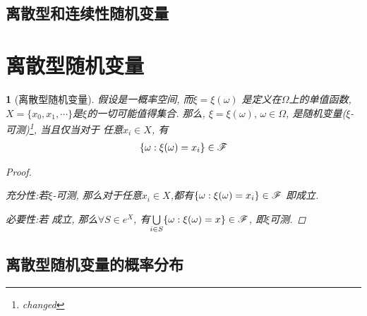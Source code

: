 \subsection{离散型和连续性随机变量}



\section{离散型随机变量}%

\newtheorem{discrete_random_var}[theorem_root]{\theorem}
\begin{discrete_random_var}[离散型随机变量]
假设\prbsp 是一概率空间, 而\(\xi = \xi(\omega)\) 是定义在\(\Omega\)上的单值函数,
\(X = \{x_0, x_1, \cdots\}\)是\(\xi\)的一切可能值得集合. 
那么, \(\xi = \xi(\omega),\,\omega\in\Omega\), 是随机变量(\(\xi\)-可测)\footnote{changed}, 当且仅当对于
任意\(x_i\in X\), 有
\begin{align}
\label{equ:equopa}
\{\omega:\xi(\omega) = x_i\}\in\msF
\end{align}

\begin{proof}
\ \par 充分性:\quad 若\(\xi\)-可测, 那么对于任意\(x_i\in X\),都有\(\{\omega:\xi(\omega) = x_i\}\in\msF\)
即成立.

必要性:\quad 若 成立, 那么\(\forall S\in e^X\), 有\(\bigcup\limits_{i\in S}\{\omega: \xi(\omega) = x\}\in\msF\),
即\(\xi\)可测.
\end{proof}
\end{discrete_random_var}

\subsection{离散型随机变量的概率分布}
\newtheorem{degrade_distru}[dis_root]{\disfunc}
\newtheorem{binomial_distru}[dis_root]{\disfunc}
\newtheorem{negative_binomial_distru}[dis_root]{\disfunc}
\newtheorem{geometry_distru}[dis_root]{\disfunc}
\newtheorem{super_geometry_distru}[dis_root]{\disfunc}
\newtheorem{negative_super_geometry_distru}[dis_root]{\disfunc}
\newtheorem{poisson_distru}[dis_root]{\disfunc}

